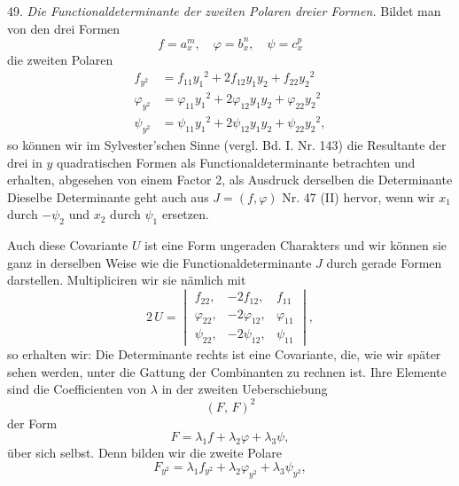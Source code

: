 49. \textit{Die Functionaldeterminante der zweiten Polaren dreier Formen.} Bildet man von den drei Formen
\[
f = a_x^m, \quad \varphi = b_x^n, \quad \psi = c_x^p
\]
die zweiten Polaren
\[
\begin{aligned}
f_{y^2} &= f_{11}y_1{}^2 + 2f_{12}y_1y_2 + f_{22}y_2{}^2 \\
\varphi_{y^2} &= \varphi_{11}y_1{}^2 + 2\varphi_{12}y_1y_2 + \varphi_{22}y_2{}^2 \\
\psi_{y^2} &= \psi_{11}y_1{}^2 + 2\psi_{12}y_1y_2 + \psi_{22}y_2{}^2,
\end{aligned}
\]
so können wir im Sylvester'schen Sinne (vergl. Bd. I. Nr. 143) die Resultante der drei in $y$ quadratischen Formen als Functionaldeterminante betrachten und erhalten, abgesehen von einem Factor 2, als Ausdruck derselben die Determinante
Dieselbe Determinante geht auch aus $J = (f, \varphi)$ Nr. 47 (II) hervor, wenn wir $x_1$ durch $-\psi_2$ und $x_2$ durch $\psi_1$ ersetzen.

Auch diese Covariante $U$ ist eine Form ungeraden Charakters und wir können sie ganz in derselben Weise wie die Functionaldeterminante $J$ durch gerade Formen darstellen. Multipliciren wir sie nämlich mit
\[
2\,U = \begin{vmatrix} f_{22}, & -2f_{12}, & f_{11} \\ \varphi_{22}, & -2\varphi_{12}, & \varphi_{11} \\ \psi_{22}, & -2\psi_{12}, & \psi_{11} \end{vmatrix},
\]
so erhalten wir:
Die Determinante rechts ist eine Covariante, die, wie wir später sehen werden, unter die Gattung der Combinanten zu rechnen ist. Ihre Elemente sind die Coefficienten von $\lambda$ in der zweiten Ueberschiebung
\[
(F,\,F)^2
\]
der Form
\[
F = \lambda_1 f + \lambda_2 \varphi + \lambda_3 \psi,
\]
über sich selbst. Denn bilden wir die zweite Polare
\[
F_{y^2} = \lambda_1 f_{y^2} + \lambda_2 \varphi_{y^2} + \lambda_3 \psi_{y^2},
\]


